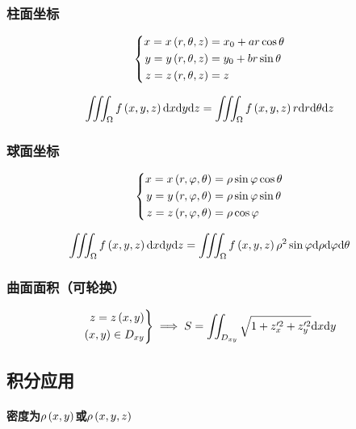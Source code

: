 \documentclass{article}
\begin{document}
\subsubsection{柱面坐标}

\[\left\{\begin{aligned}
        x=x\left(r,\theta,z\right) & =x_0+ar\cos\theta \\
        y=y\left(r,\theta,z\right) & =y_0+br\sin\theta \\
        z=z\left(r,\theta,z\right) & =z
    \end{aligned}\right.\]

\[
    \iiint_\Omega f\left(x,y,z\right)\mathrm d x\mathrm d y\mathrm d z=
    \iiint_\Omega f\left(x,y,z\right)r\mathrm d r\mathrm d\theta\mathrm d z\]

\subsubsection{球面坐标}

\[\left\{\begin{aligned}
        x=x\left(r,\varphi,\theta\right) & =\rho\sin\varphi\cos\theta \\
        y=y\left(r,\varphi,\theta\right) & =\rho\sin\varphi\sin\theta \\
        z=z\left(r,\varphi,\theta\right) & =\rho\cos\varphi           \\
    \end{aligned}\right.\]

\[
    \iiint_\Omega f\left(x,y,z\right)\mathrm d x\mathrm d y\mathrm d z=
    \iiint_\Omega f\left(x,y,z\right)\rho^2\sin\varphi\mathrm d\rho\mathrm d\varphi\mathrm d\theta\]

\subsubsection{曲面面积（可轮换）}

\[\left.\begin{aligned}
        z=z\left(x,y\right) \\
        \left(x,y\right)\in D_{xy}
    \end{aligned}\right\}\implies
    S=\iint_{D_{xy}}\sqrt{1+z^{\prime2}_x+z^{\prime2}_y}\mathrm d x\mathrm d y\]

\subsection{积分应用}

\paragraph{密度为$\rho\left(x,y\right)$或$\rho\left(x,y,z\right)$}
\end{document}
